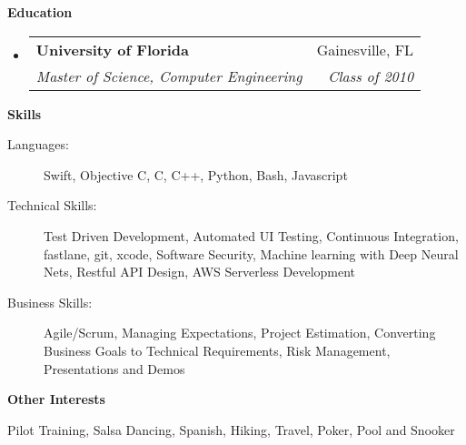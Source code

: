 \documentclass[letterpaper,11pt]{article}
\makeatletter
\newcommand{\resheading}[1]{{\large \colorbox{mygrey}{\begin{minipage}{\textwidth}{\textbf{#1 \vphantom{p\^{E}}}}\end{minipage}}}}
\newcommand{\ressubheading}[4]{
\begin{tabular*}{7.0in}{l@{\extracolsep{\fill}}r}
    \textbf{#1} & #2 \\
    \textit{#3} & \textit{#4} \\
\end{tabular*}\vspace{-6pt}}
\makeatother
\begin{document}
\vspace{0.2in}
  
\resheading{Education}
\begin{itemize}
\item
    \ressubheading{University of Florida}{Gainesville, FL}{{Master of Science, Computer Engineering}}{Class of 2010}
\end{itemize}

\vspace{0.2in}

\resheading{Skills}
\begin{description}
\item[Languages:]
Swift, Objective C, C, C++, Python, Bash, Javascript
\item[Technical Skills:] Test Driven Development, Automated UI Testing, Continuous Integration, fastlane, git, xcode, Software Security,
Machine learning with Deep Neural Nets, Restful API Design, AWS Serverless Development
\item[Business Skills:]
Agile/Scrum, Managing Expectations, Project Estimation, Converting Business Goals to Technical Requirements, Risk Management, Presentations and Demos
\end{description}

\vspace{0.2in}

\resheading{Other Interests}
\begin{description}
\item Pilot Training, Salsa Dancing, Spanish, Hiking, Travel, Poker, Pool and Snooker
\end{description}
\end{document}
